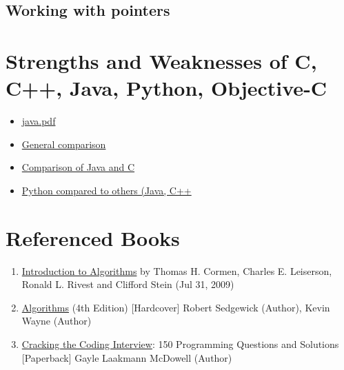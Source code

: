 \documentclass[letterpaper]{article}
\begin{document}
\subsection{Working with pointers}

\section{Strengths and Weaknesses of C, C++, Java, Python, Objective-C}
\begin{itemize}
\item
\href{https://files.nyu.edu/ahl266/public/java.pdf}{java.pdf}
\item
\href{http://introcs.cs.princeton.edu/java/faq/c2java.html}{General comparison}
\item
\href{http://en.wikipedia.org/wiki/Comparison_of_Java_and_C}{Comparison of Java and C} 
\item
\href{http://www.python.org/doc/essays/comparisons.html}{Python compared to others (Java, C++}
\end{itemize}

\section{Referenced Books}
\begin{enumerate}
\item \href{http://www.amazon.com/Thomas-H.-Cormen/e/B000AQ24AS}{Introduction to Algorithms} by Thomas H. Cormen, Charles E. Leiserson, Ronald L. Rivest and Clifford Stein (Jul 31, 2009)
\item \href{http://www.amazon.com/Algorithms-4th-Robert-Sedgewick/dp/032157351X/ref=sr_1_1?s=books&ie=UTF8&qid=1381401589&sr=1-1&keywords=algorithms+sedgewick+4th+edition}{Algorithms} (4th Edition) [Hardcover]
Robert Sedgewick (Author), Kevin Wayne (Author)
\item \href{http://www.amazon.com/Cracking-Coding-Interview-Programming-Questions/dp/098478280X/ref=sr_1_1?s=books&ie=UTF8&qid=1381401682&sr=1-1&keywords=cracking+the+coding+interview}{Cracking the Coding Interview}: 150 Programming Questions and Solutions [Paperback]
Gayle Laakmann McDowell (Author)


\end{enumerate}
\end{document}
